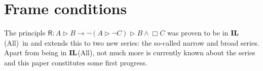 \documentclass[twoside]{aiml20}
\newcommand{\intl}[1]{{\ensuremath {\textup{\textbf{IL}}}({\rm #1})}}
\newcommand{\ilal}{\intl{All}\xspace}
\newcommand{\principle}[1]{\text{$\mathsf{#1}$}}
\newcommand{\jan}[1]{\textcolor{orange}{\bf Jan: #1}}
\newcommand{\luka}[1]{\textcolor{blue}{\bf Luka: #1}}
\begin{document}
%
%
%
%

\section{Frame conditions}
The principle $\principle{R}: A \rhd  B \to  \neg  (A \rhd  \neg  C) \rhd  B \wedge  \Box  C$ was proven to be in \ilal~in \cite{GorisJoosten:2011:ANewPrinciple} and \cite{two-new-series} extends this to two new series: the so-called narrow and broad series. Apart from being in \ilal, not much more is currently known about the series and this paper constitutes some first progress.
\label{sec:org39caeeb}
\end{document}
